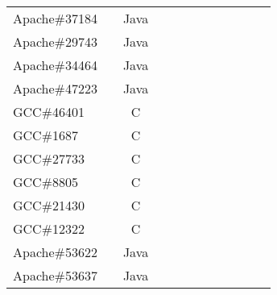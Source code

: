 \begin{table*}
\begin{tabular}{lcccc|cccc|ccc}
\midrule
Apache\#37184     &    & Java  &  &              &    &                                 &                   &                           &                        &   &        \\ 
Apache\#29743     &    & Java  &  &              &    &                                 &                   &                           &                        &   &        \\
Apache\#34464     &    & Java  &  &              &    &                                 &                   &                           &                        &   &        \\
Apache\#47223     &    & Java  &  &              &    &                                 &                   &                           &                        &   &        \\
\midrule
GCC\#46401        &    & C  &  &              &    &                                 &                   &                           &                        &   &        \\
GCC\#1687         &    & C  &  &              &    &                                 &                   &                           &                        &   &        \\
GCC\#27733        &    & C  &  &              &    &                                 &                   &                           &                        &   &        \\
GCC\#8805         &    & C  &  &              &    &                                 &                   &                           &                        &   &        \\
GCC\#21430        &    & C  &  &              &    &                                 &                   &                           &                        &   &        \\
GCC\#12322        &    & C  &  &              &    &                                 &                   &                           &                        &   &        \\
\midrule
\midrule
Apache\#53622     &    & Java  &  &              &    &                                 &                   &                           &                        &   &        \\
Apache\#53637     &    & Java  &  &              &    &                                 &                   &                           &                        &   &        \\

\end{tabular}
\end{table*}
